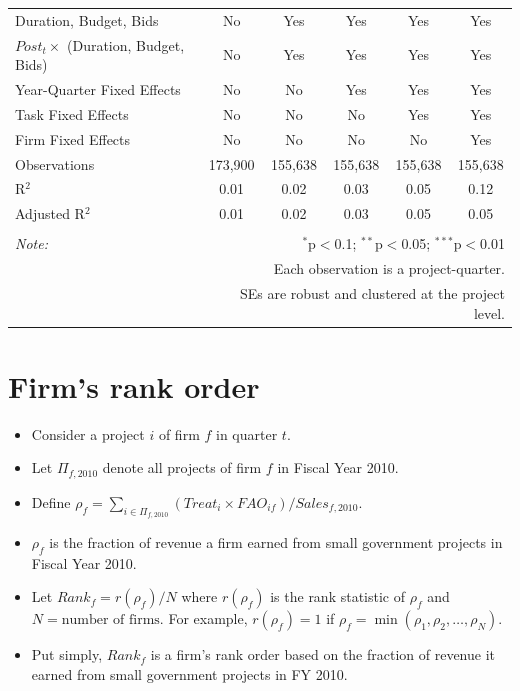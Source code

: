 \documentclass[
]{article}
\providecommand{\tightlist}{%
  \setlength{\itemsep}{0pt}\setlength{\parskip}{0pt}}
\begin{document}
\begin{table}[H]
\begin{tabular}{@{\extracolsep{-2pt}}lccccc}
Duration, Budget, Bids & No & Yes & Yes & Yes & Yes \\ 
$Post_t \times $  (Duration, Budget, Bids) & No & Yes & Yes & Yes & Yes \\ 
Year-Quarter Fixed Effects & No & No & Yes & Yes & Yes \\ 
Task Fixed Effects & No & No & No & Yes & Yes \\ 
Firm Fixed Effects & No & No & No & No & Yes \\ 
Observations & 173,900 & 155,638 & 155,638 & 155,638 & 155,638 \\ 
R$^{2}$ & 0.01 & 0.02 & 0.03 & 0.05 & 0.12 \\ 
Adjusted R$^{2}$ & 0.01 & 0.02 & 0.03 & 0.05 & 0.05 \\ 
\hline 
\hline \\[-1.8ex] 
\textit{Note:}  & \multicolumn{5}{r}{$^{*}$p$<$0.1; $^{**}$p$<$0.05; $^{***}$p$<$0.01} \\ 
 & \multicolumn{5}{r}{Each observation is a project-quarter.} \\ 
 & \multicolumn{5}{r}{SEs are robust and clustered at the project level.} \\ 
\end{tabular} 
\end{table}

\hypertarget{firms-rank-order}{%
\section{Firm's rank order}\label{firms-rank-order}}

\begin{itemize}
\tightlist
\item
  Consider a project \(i\) of firm \(f\) in quarter \(t\).
\item
  Let \(\Pi_{f,2010}\) denote all projects of firm \(f\) in Fiscal Year
  2010.
\item
  Define
  \(\rho_f = \sum_{i \in \Pi_{f,2010}} (Treat_i \times FAO_{if})/Sales_{f,\text{2010}}\).
\item
  \(\rho_f\) is the fraction of revenue a firm earned from small
  government projects in Fiscal Year 2010.
\item
  Let \(Rank_f = r(\rho_f)/N\) where \(r(\rho_f)\) is the rank statistic
  of \(\rho_{f}\) and \(N = \text{number of firms}.\) For example,
  \(r(\rho_f)=1\) if \(\rho_f=\min(\rho_1,\rho_2,\ldots,\rho_N)\).
\item
  Put simply, \(Rank_f\) is a firm's rank order based on the fraction of
  revenue it earned from small government projects in FY 2010.
\end{itemize}
\end{document}
